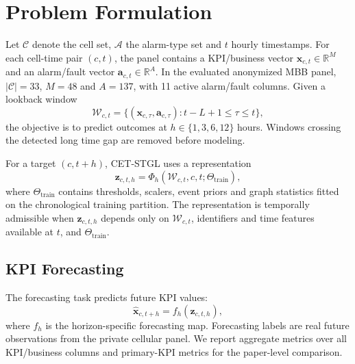 \section{Problem Formulation}
\label{sec:problem_method}
\label{sec:problem_formulation}

Let $\mathcal{C}$ denote the cell set, $\mathcal{A}$ the alarm-type set and $t$ hourly timestamps. For each cell-time pair $(c,t)$, the panel contains a KPI/business vector $\mathbf{x}_{c,t}\in\mathbb{R}^{M}$ and an alarm/fault vector $\mathbf{a}_{c,t}\in\mathbb{R}^{A}$. In the evaluated anonymized MBB panel, $|\mathcal{C}|=33$, $M=48$ and $A=137$, with 11 active alarm/fault columns. Given a lookback window
\begin{equation}
    \mathcal{W}_{c,t}=\{(\mathbf{x}_{c,\tau},\mathbf{a}_{c,\tau}):t-L+1\leq \tau\leq t\},
\end{equation}
the objective is to predict outcomes at $h\in\{1,3,6,12\}$ hours. Windows crossing the detected long time gap are removed before modeling.

For a target $(c,t+h)$, CET-STGL uses a representation
\begin{equation}
    \mathbf{z}_{c,t,h}=\Phi_h(\mathcal{W}_{c,t},c,t;\Theta_{\mathrm{train}}),
\end{equation}
where $\Theta_{\mathrm{train}}$ contains thresholds, scalers, event priors and graph statistics fitted on the chronological training partition. The representation is temporally admissible when $\mathbf{z}_{c,t,h}$ depends only on $\mathcal{W}_{c,t}$, identifiers and time features available at $t$, and $\Theta_{\mathrm{train}}$.

\subsection{KPI Forecasting}
The forecasting task predicts future KPI values:
\begin{equation}
    \hat{\mathbf{x}}_{c,t+h}=f_h(\mathbf{z}_{c,t,h}),
\end{equation}
where $f_h$ is the horizon-specific forecasting map. Forecasting labels are real future observations from the private cellular panel. We report aggregate metrics over all KPI/business columns and primary-KPI metrics for the paper-level comparison.

